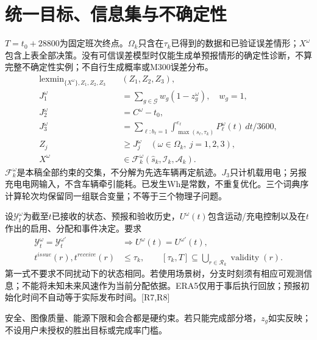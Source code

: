 \section{统一目标、信息集与不确定性}
\noindent $T=t_0+28800$为固定班次终点。$\Omega_k$只含在$\tau_k$已得到的数据和已验证误差情形；$X^\omega$包含上表全部决策。没有可信误差模型时仅能生成单预报情形的确定性诊断，不算完整不确定性实例；不自行生成概率或M300误差分布。
\begin{align}
 \operatorname{lexmin}_{\{X^\omega\},Z_1,Z_2,Z_3}\quad &(Z_1,Z_2,Z_3),\label{eng:eq:objective}\\
 J_1^\omega&=\sum_{g\in\mathcal G}w_g(1-z_g^\omega),\quad w_g=1,\\
 J_2^\omega&=C^\omega-t_0,\\
 J_3^\omega&=\sum_{\ell:b_\ell=1}\int_{\max(s_\ell,\tau_k)}^{e_\ell}
                       P_\ell^\omega(t)\,dt/3600,\\
 Z_j&\ge J_j^\omega\quad(\omega\in\Omega_k,\ j=1,2,3),\\
 X^\omega&\in\mathcal F_k^\omega(\widehat s_k,\mathcal I_k,\mathcal A_k).
 \label{eng:eq:rollingjoint}
\end{align}
\noindent $\mathcal F_k^\omega$是本稿全部约束的交集，不分解为先选车辆再定航迹。$J_3$只计机载用电；另报充电电网输入，不含车辆牵引能耗。已发生Wh是常数，不重复优化。三个词典序计算轮次均保留同一组联合变量；不等于三个物理子问题。

\noindent 设$\mathcal Y_t^\omega$为截至$t$已接收的状态、预报和验收历史，$U^\omega(t)$包含运动/充电控制以及在$t$作出的启用、分配和事件决定。要求
\begin{align}
 \mathcal Y_t^\omega=\mathcal Y_t^{\omega'}&\Rightarrow
 U^\omega(t)=U^{\omega'}(t),\label{eng:eq:nonanticipativity}\\
 t^{issue}(r),t^{receive}(r)&\le\tau_k,\qquad
 [\tau_k,T]\subseteq\bigcup_{r\in\mathcal R_k}\operatorname{validity}(r).
 \label{eng:eq:forecastcausality}
\end{align}
\noindent 第一式不要求不同扰动下的状态相同。若使用场景树，分支时刻须有相应可观测信息；不能将未知未来风速作为当前分配依据。ERA5仅用于事后执行回放；预报初始化时间不自动等于实际发布时间。[R7,R8]

\noindent 安全、图像质量、能源下限和会合都是硬约束。若只能完成部分塔，$z_g$如实反映；不设用户未授权的胜出目标或完成率门槛。
\clearpage

